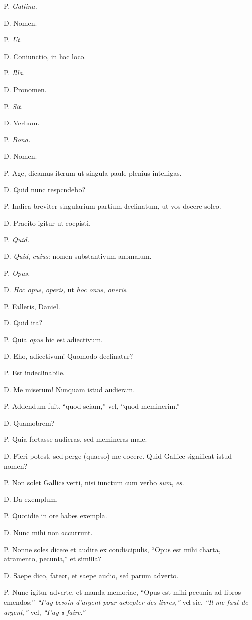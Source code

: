 \documentclass{article}
\begin{document}
P. \emph{Gallina.}

D. Nomen.

P. \emph{Ut.}

D. Coniunctio, in hoc loco.

P. \emph{Illa.}

D. Pronomen.

P. \emph{Sit.}

D. Verbum.

P. \emph{Bona.}

D. Nomen.

P. Age, dicamus iterum ut singula paulo plenius intelligas.

D. Quid nunc respondebo?

P. Indica breviter singularium partium declinatum, ut vos docere soleo.

D. Praeito igitur ut coepisti.

P. \emph{Quid.}

D. \emph{Quid}, \emph{cuius}: nomen substantivum anomalum.

P. \emph{Opus.}

D. \emph{Hoc opus}, \emph{operis,} ut \emph{hoc onus}, \emph{oneris.}

P. Falleris, Daniel.

D. Quid ita?

P. Quia \emph{opus} hic est adiectivum.

D. Eho, adiectivum! Quomodo declinatur?

P. Est indeclinabile.

D. Me miserum! Nunquam istud audieram.

P. Addendum fuit, ``quod sciam,'' vel, ``quod meminerim.''

D. Quamobrem?

P. Quia fortasse audieras, sed memineras male.

D. Fieri potest, sed perge (quaeso) me docere. Quid Gallice significat istud nomen?

P. Non solet Gallice verti, nisi iunctum cum verbo \emph{sum}, \emph{es.}

D. Da exemplum.

P. Quotidie in ore habes exempla.

D. Nunc mihi non occurrunt.

P. Nonne soles dicere et audire ex condiscipulis, ``Opus est mihi charta, atramento, pecunia,'' et similia?

D. Saepe dico, fateor, et saepe audio, sed parum adverto.

P. Nunc igitur adverte, et manda memoriae, ``Opus est mihi pecunia ad libros emendos:'' \emph{``I’ay besoin d’argent pour achepter des livres,''} vel sic, \emph{``Il me faut de argent,''} vel, \emph{``I’ay a faire.''}
\end{document}
